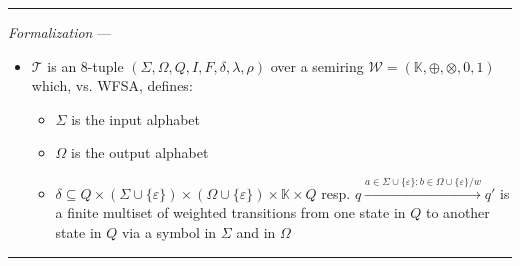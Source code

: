{\color{lightgray}\hrule height 0.001mm}

\emph{Formalization} --- 
\begin{itemize}
    \item $\mathcal{T}$ is an 8-tuple $(\Sigma, \Omega, Q, I, F, \delta, \lambda, \rho)$ over a semiring $\mathcal{W} = (\mathbb{K}, \oplus, \otimes, 0, 1)$ which, vs. WFSA, defines:
    \begin{itemize}
        \item $\Sigma$ is the input alphabet 
        \item $\Omega$ is the output alphabet 
        \item $\delta \subseteq Q \times (\Sigma \cup \{\varepsilon\}) \times (\Omega \cup \{\varepsilon\}) \times \mathbb{K} \times Q$ resp. $q \xrightarrow{a \in \Sigma \cup \{\varepsilon\} : b \in \Omega \cup \{\varepsilon\} / w} q'$ is a finite multiset of weighted transitions from one state in $Q$ to another state in $Q$ via a symbol in $\Sigma$ and in $\Omega$
    \end{itemize}
\end{itemize}

{\color{black}\hrule height 0.001mm}

